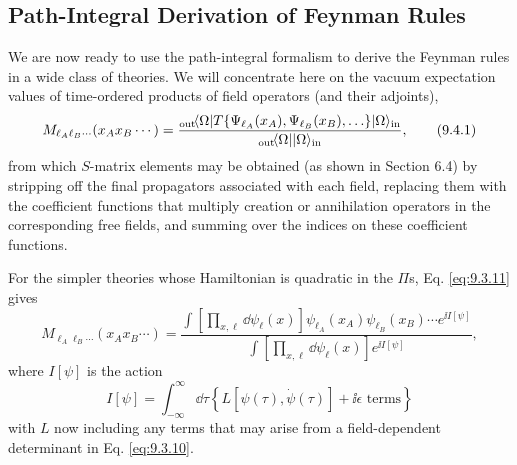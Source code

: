 
\subsection{Path-Integral Derivation of Feynman Rules}

We are now ready to use the path-integral formalism to derive the Feynman
rules in a wide class of theories. We will concentrate here on the vacuum
expectation values of time-ordered products of field operators (and their
adjoints),
\begin{equation}
M_{\ell_A\ell_B\cdots}(x_Ax_B\cdots)
=\frac{{}_{\mathrm{out}}\!\langle \Omega\rvert T\{\Psi_{\ell_A}(x_A),
 \Psi_{\ell_B}(x_B),\ldots\}\lvert \Omega\rangle_{\mathrm{in}}}
 {{}_{\mathrm{out}}\!\langle \Omega\rvert\lvert \Omega\rangle_{\mathrm{in}}},
\tag{9.4.1}\label{eq:9.4.1}
\end{equation}
from which $S$-matrix elements may be obtained (as shown in Section 6.4) by
stripping off the final propagators associated with each field, replacing them
with the coefficient functions that multiply creation or annihilation
operators in the corresponding free fields, and summing over the indices on
these coefficient functions.

For the simpler theories whose Hamiltonian is quadratic in the $\Pi$s,
Eq. \eqref{eq:9.3.11} gives
\begin{equation}
M_{\ell_A\ell_B\cdots}(x_Ax_B\cdots)
=\frac{\displaystyle\int\left[\prod_{x,\ell}\dd\psi_\ell(x)\right]
 \psi_{\ell_A}(x_A)\psi_{\ell_B}(x_B)\cdots e^{\ii I[\psi]}}
 {\displaystyle\int\left[\prod_{x,\ell}\dd\psi_\ell(x)\right]e^{\ii I[\psi]}},
\tag{9.4.2}\label{eq:9.4.2}
\end{equation}
where $I[\psi]$ is the action
\begin{equation}
I[\psi]=\int_{-\infty}^{\infty}\dd\tau
 \left\{L[\psi(\tau),\dot\psi(\tau)]+\ii\epsilon\text{ terms}\right\}
\tag{9.4.3}\label{eq:9.4.3}
\end{equation}
with $L$ now including any terms that may arise from a field-dependent
determinant in Eq. \eqref{eq:9.3.10}.


